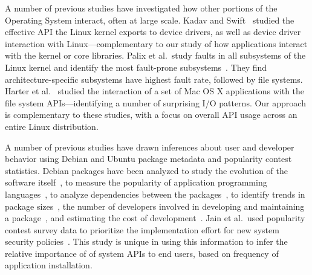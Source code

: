 A number of previous studies have investigated how other portions of the Operating System
interact, often at large scale.
Kadav and Swift~\cite{understand-drivers} studied the effective API the Linux kernel exports 
to device drivers, as well as device driver interaction with Linux---complementary to our study
of how applications interact with the kernel or core libraries.
Palix et al.\ study faults in all subsystems of the Linux kernel and identify the 
most fault-prone subsystems~\cite{linux-faults}.
They find architecture-specific subsystems have highest fault rate, followed by file systems.
Harter et al.~\cite{file-not-file} studied
 the interaction of a set of Mac OS X applications with the file system APIs---identifying a number
of surprising I/O patterns.
Our approach is complementary to these studies, with a focus on overall API 
usage across an entire Linux distribution.




A number of previous studies have drawn inferences about user and developer behavior
using Debian and Ubuntu package metadata and popularity contest statistics.
Debian packages have been analyzed to study the evolution 
of the software itself~\cite{macro-study, life-death, mining-over-time}, 
to measure the popularity of application programming 
languages~\cite{upgrade-libre}, to analyze dependencies between the packages~\cite{package-dependency}, 
to identify trends in package sizes~\cite{pigs-to-stripes}, 
the number of developers involved in developing and maintaining a package~\cite{toy-story},
and estimating the cost of development~\cite{measuring-woody}.
Jain et al.\ used popularity contest survey data to 
prioritize the implementation effort for new system security policies~\cite{jain14setuid}. %
This study is unique in using this information to infer the relative importance of 
of system APIs to end users, based on frequency of application installation.

